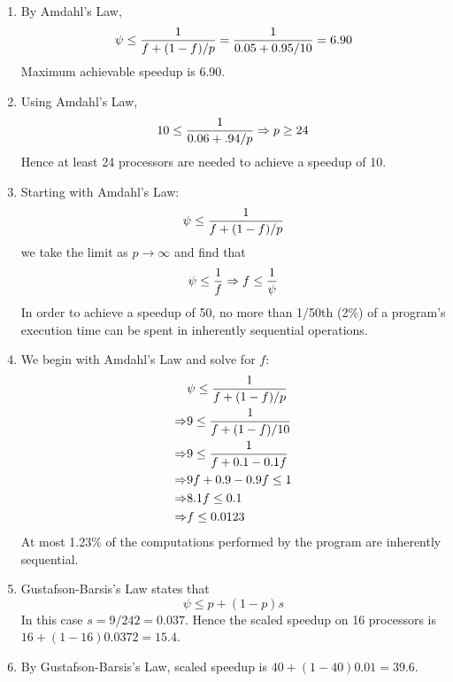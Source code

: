 \begin{enumerate}
\item By Amdahl's Law,
$$\psi \le {{1}\over{f + (1-f)/p}} = {{1}\over{0.05 + 0.95/10}} = 6.90$$
Maximum achievable speedup is 6.90.

\item Using Amdahl's Law,
$$10 \le {{1}\over{0.06 + .94/p}} \Rightarrow p \ge 24$$
Hence at least 24 processors are needed to achieve a speedup of 10.

\item Starting with Amdahl's Law:
$$\psi \le {{1}\over{f + (1-f)/p}}$$
we take the limit as $p \rightarrow \infty$ and find that
$$\psi \le {{1}\over{f}} \Rightarrow f \le {{1}\over{\psi}}$$
In order to achieve a speedup of 50, no more than 1/50th (2\%) of a program's
execution time can be spent in inherently sequential operations.

\item We begin with Amdahl's Law and solve for $f$:
\begin{equation*}
\begin{split}
            & \psi \le {{1}\over{f + (1-f)/p}} \\
\Rightarrow & 9 \le {{1}\over{f + (1-f)/10}} \\
\Rightarrow & 9 \le {{1}\over{f + 0.1 - 0.1f}} \\
\Rightarrow & 9f + 0.9 -0.9f \le 1 \\
\Rightarrow & 8.1f \le 0.1\\
\Rightarrow & f \le 0.0123
\end{split}
\end{equation*}
At most 1.23\% of the computations performed by the program are
inherently sequential.

\item Gustafson-Barsis's Law states that
$$\psi \le p + (1-p)s$$
In this case $s = 9/242 = 0.037$.
Hence the scaled speedup on 16 processors is $16 + (1-16)0.0372 = 15.4$.

\item By Gustafson-Barsis's Law, scaled speedup is $40 + (1-40)0.01 = 39.6$.


\end{enumerate}
